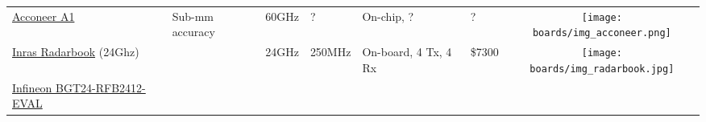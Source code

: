 \begin{longtable}[]{@{}llllllc@{}}
\begin{minipage}[t]{\colwidthA}\raggedright\strut
	\href{ http://www.acconeer.com/}{Acconeer A1}
\strut\end{minipage} &
\begin{minipage}[t]{\colwidthB}\raggedright\strut
Sub-mm accuracy
\strut\end{minipage} &
\begin{minipage}[t]{\colwidthC}\raggedright\strut
60GHz
\strut\end{minipage} &
\begin{minipage}[t]{\colwidthD}\raggedright\strut
?
\strut\end{minipage} &
\begin{minipage}[t]{\colwidthE}\raggedright\strut
On-chip, ?
\strut\end{minipage} &
\begin{minipage}[t]{\colwidthF}\raggedright\strut
?
\strut\end{minipage} &
\begin{minipage}[t]{\colwidthG}\centering\strut
\texttt{[image: boards/img\_acconeer.png]}
\strut\end{minipage}\tabularnewline

\begin{minipage}[t]{\colwidthA}\raggedright\strut
\href{dkradarbook}{Inras Radarbook} (24Ghz)
\strut\end{minipage} &
\begin{minipage}[t]{\colwidthB}\raggedright\strut

\strut\end{minipage} &
\begin{minipage}[t]{\colwidthC}\raggedright\strut
24GHz
\strut\end{minipage} &
\begin{minipage}[t]{\colwidthD}\raggedright\strut
250MHz
\strut\end{minipage} &
\begin{minipage}[t]{\colwidthE}\raggedright\strut
On-board, 4 Tx, 4 Rx
\strut\end{minipage} &
\begin{minipage}[t]{\colwidthF}\raggedright\strut
\$7300
\strut\end{minipage} &
\begin{minipage}[t]{\colwidthG}\centering\strut
\texttt{[image: boards/img\_radarbook.jpg]}
\strut\end{minipage}\tabularnewline

\begin{minipage}[t]{\colwidthA}\raggedright\strut
	\href{https://www.infineon.com/dgdl/Infineon-AN380_BGT24-RFB2412_user_manual-AN-v01_00-EN.pdf?fileId=5546d46259d9a4bf0159f9f1fa503f1d}{Infineon BGT24-RFB2412-EVAL}
\strut\end{minipage} &
\begin{minipage}[t]{\colwidthB}\raggedright\strut


\end{minipage}
\end{longtable}
